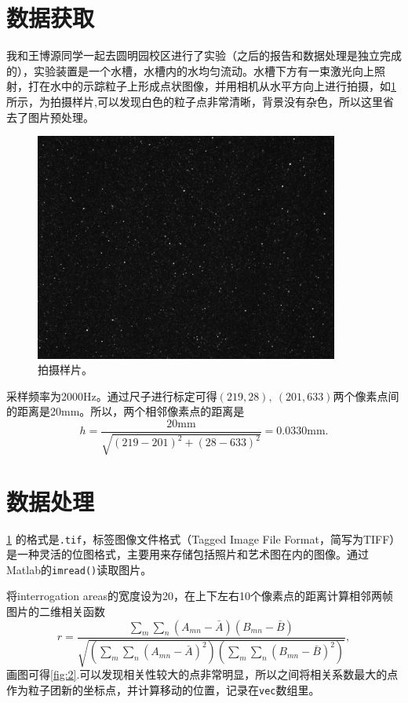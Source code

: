 \documentclass[12pt]{article}
\begin{document}
\section{数据获取}

我和王博源同学一起去圆明园校区进行了实验（之后的报告和数据处理是独立完成的），实验装置是一个水槽，水槽内的水均匀流动。水槽下方有一束激光向上照射，打在水中的示踪粒子上形成点状图像，并用相机从水平方向上进行拍摄，如\cref{fig:1} 所示，为拍摄样片,可以发现白色的粒子点非常清晰，背景没有杂色，所以这里省去了图片预处理。

\begin{figure}[htp]
	\centering
	\includegraphics[width=10cm]{001}
	\caption{拍摄样片。}
	\label{fig:1}
\end{figure}

采样频率为2000Hz。通过尺子进行标定可得$(219,28),\ (201,633)$两个像素点间的距离是20mm。所以，两个相邻像素点的距离是
\begin{equation}
	h = \frac{20 \mathrm{mm}}{\sqrt{\left(219-201\right)^2+\left(28-633\right)^2}} = 0.0330 \mathrm{mm}.
\end{equation}



\section{数据处理}

\cref{fig:1} 的格式是\texttt{.tif}，标签图像文件格式（Tagged Image File Format，简写为TIFF）是一种灵活的位图格式，主要用来存储包括照片和艺术图在内的图像。通过Matlab的\texttt{imread()}读取图片。

将interrogation areas的宽度设为20，在上下左右10个像素点的距离计算相邻两帧图片的二维相关函数
\begin{equation}
	r=\frac{\sum_{m} \sum_{n}\left(A_{m n}-\bar{A}\right)\left(B_{m n}-\bar{B}\right)}{\sqrt{\left(\sum_{m} \sum_{n}\left(A_{m n}-\bar{A}\right)^{2}\right)\left(\sum_{m} \sum_{n}\left(B_{m n}-\bar{B}\right)^{2}\right)}},
\end{equation}
画图可得\cref{fig:2}.可以发现相关性较大的点非常明显，所以之间将相关系数最大的点作为粒子团新的坐标点，并计算移动的位置，记录在\texttt{vec}数组里。
\end{document}
